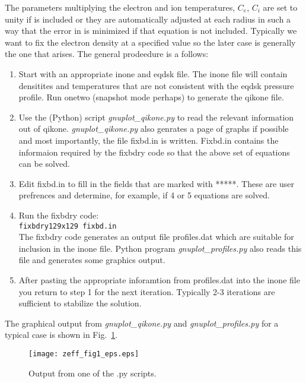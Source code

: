 The parameters multiplying the electron and ion temperatures, $C_e$, $C_i$ are
set to unity if  is included or they are automatically adjusted
at  each radius in such a way that the error in  is minimized if
that equation is not  included. Typically we want to fix the electron density at
a specified value so the later case is generally the one that arises.  The
general prodeedure is a follows:
\begin{enumerate}
 \item Start with an appropriate inone and eqdsk file. The inone file will
 contain densitites and temperatures that are not consistent with the eqdsk
 pressure profile. Run onetwo (snapshot mode perhaps) to generate the qikone 
 file.
 \item Use the (Python) script \emph{gnuplot\_qikone.py} to read the  relevant
 information out of qikone. \emph{gnuplot\_qikone.py} also genrates a page of
 graphs if possible and most importantly, the file fixbd.in is written. Fixbd.in
 contains the informaion required by the fixbdry code so that the above set of
 equations can be solved.
 \item Edit fixbd.in to fill in the fields that are marked with *****. These are
 user prefrences and determine, for example, if 4 or 5 equations are solved.
 \item Run the fixbdry code: \\
 \texttt{fixbdry129x129  fixbd.in} \\
 The fixbdry code generates an output file profiles.dat which are suitable for
 inclusion in the inone file. Python program \emph{gnuplot\_profiles.py} also
 reads this file and generates some graphics output.
 \item After pasting the appropriate inforamtion from profiles.dat into the
 inone file you return to step 1 for the next iteration. Typically 2-3
 iterations are sufficient to stabilize the solution.
\end{enumerate}
The graphical  output from \emph{gnuplot\_qikone.py}  and
\emph{gnuplot\_profiles.py} for a typical case is shown in Fig.~\ref{profiles}.
\begin{figure}
 \texttt{[image: zeff\_fig1\_eps.eps]}
 \caption{Output from one of the .py scripts.\label{profiles}}
\end{figure}
